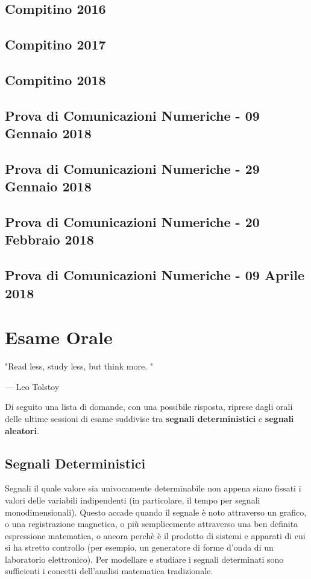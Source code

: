 \documentclass[12pt,oneside,openany]{memoir}
\numberwithin{equation}{subsection}
\begin{document}
\newpage
\section{Compitino 2016}

\newpage
\section{Compitino 2017}

\newpage
\section{Compitino 2018}

\newpage
\section{Prova di Comunicazioni Numeriche - 09 Gennaio 2018}

\newpage
\section{Prova di Comunicazioni Numeriche - 29 Gennaio 2018}

\newpage
\section{Prova di Comunicazioni Numeriche - 20 Febbraio 2018}

\newpage
\section{Prova di Comunicazioni Numeriche - 09 Aprile 2018}


\chapter{Esame Orale}
\epigraph{"Read less, study less, but think more.	"}{--- \textup{Leo Tolstoy}}

Di seguito una lista di domande, con una possibile risposta, riprese dagli orali delle ultime sessioni di esame suddivise tra \textbf{segnali deterministici} e \textbf{segnali aleatori}.

\section{Segnali Deterministici}
Segnali il quale valore sia univocamente determinabile non appena siano fissati i valori delle variabili indipendenti (in particolare, il tempo per segnali monodimensionali). Questo accade quando il segnale \`e noto attraverso un grafico, o una registrazione magnetica, o pi\`u semplicemente attraverso una ben definita espressione matematica, o ancora perch\`e \`e il prodotto di sistemi e apparati di cui si ha stretto controllo (per esempio, un generatore di forme d'onda di un laboratorio elettronico).
Per modellare e studiare i segnali determinati sono sufficienti i concetti dell'analisi matematica tradizionale.
\end{document}
